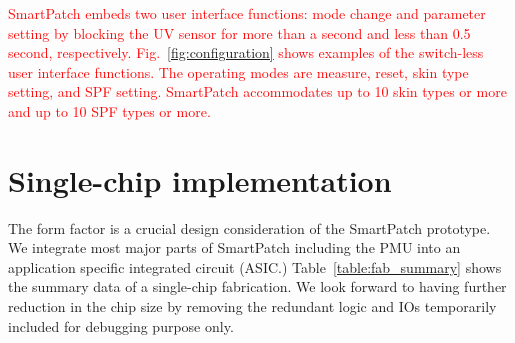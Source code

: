 \documentclass[journal]{IEEEtran}
\begin{document}

\textcolor{red}{SmartPatch embeds two user interface functions: mode change and parameter setting by blocking the UV sensor for more than a second and less than 0.5 second, respectively. Fig.~\ref{fig:configuration} shows examples of the switch-less user interface functions. The operating modes are measure, reset, skin type setting, and SPF setting. SmartPatch accommodates up to 10 skin types or more and up to 10 SPF types or more.}


\section{Single-chip implementation}

The form factor is a crucial design consideration of the SmartPatch prototype.
We integrate most major parts of SmartPatch including the PMU into an application specific integrated circuit (ASIC.)
Table~\ref{table:fab_summary} shows the summary data of a single-chip fabrication.
We look forward to having further reduction in the chip size by removing the redundant logic and IOs temporarily included for debugging purpose only.
\end{document}

